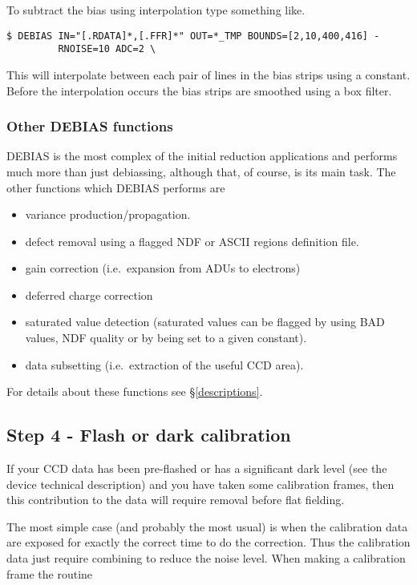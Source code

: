 To subtract the bias using interpolation type something like.

\begin{myquote}
\begin{verbatim}
$ DEBIAS IN="[.RDATA]*,[.FFR]*" OUT=*_TMP BOUNDS=[2,10,400,416] -
         RNOISE=10 ADC=2 \
\end{verbatim}
\end{myquote}

This will interpolate between each pair of lines in the bias strips
using a  constant. Before the interpolation occurs the bias strips are
smoothed using a box filter.

\subsubsection{ Other DEBIAS functions}
DEBIAS is the most complex of the initial reduction applications 
and performs much more than just debiassing, although that, of course,
is its main task. The other functions which DEBIAS performs are

\begin{itemize}
\item variance production/propagation.
\item defect removal using a flagged NDF or ASCII regions definition
file.
\item gain correction (i.e.\ expansion from ADUs to electrons)
\item deferred charge correction
\item saturated value detection (saturated values can be flagged by
using BAD values, NDF quality or by being set to a given constant).
\item data subsetting (i.e.\ extraction of the useful CCD area).
\end{itemize}

For details about these functions see \S\ref{descriptions}.

\subsection{Step 4 - Flash or dark calibration}

If your CCD data has been pre-flashed or has a significant dark level
(see the device technical description) and you have taken some
calibration frames, then this contribution to the data will require
removal before flat fielding.

The most simple case (and probably the most usual) is when the
calibration data are exposed for exactly the correct time to do the
correction. Thus the calibration data just require combining to reduce
the noise level. When making a calibration frame the routine


